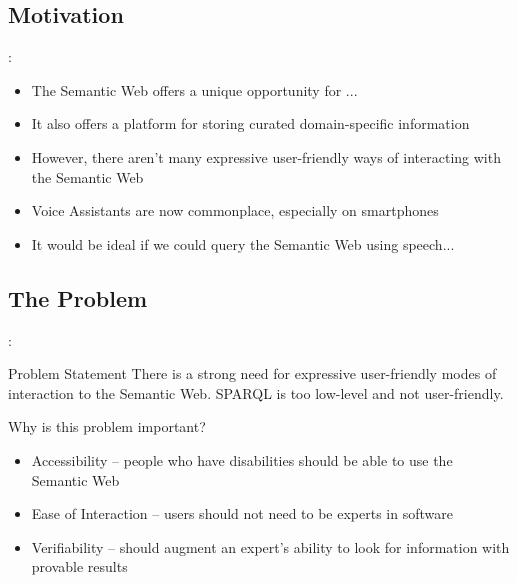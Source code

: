 \documentclass[logoontitle,tabu,supertabular,aspectratio=43]{preney-uwindsor-beamer}
\begin{document}
\subsection{Motivation}
\begin{frame}{\insertsection: \insertsubsection}
    \begin{itemize}
        \item The Semantic Web offers a unique opportunity for ...
        \item It also offers a platform for storing curated domain-specific information
        \item However, there aren't many expressive user-friendly ways of interacting with the Semantic Web

        \item Voice Assistants are now commonplace, especially on smartphones
        \item It would be ideal if we could query the Semantic Web using speech...
    \end{itemize}
\end{frame}

    \subsection{The Problem}
    \begin{frame}{\insertsection: \insertsubsection}

        \begin{block}{Problem Statement}
            There is a strong need for expressive user-friendly modes of interaction to the Semantic Web.  SPARQL is too low-level and not user-friendly.
        \end{block}

        Why is this problem important?
        \begin{itemize}
            \item Accessibility -- people who have disabilities should be able to use the Semantic Web
            \item Ease of Interaction -- users should not need to be experts in software

            \item Verifiability -- should augment an expert's ability to look for information with provable results
        \end{itemize}

    \end{frame}
\end{document}
